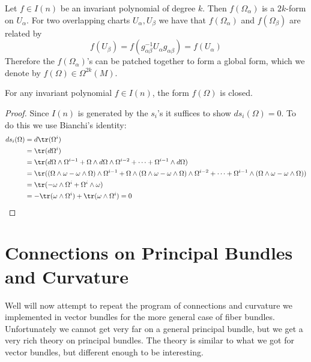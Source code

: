 


Let $f \in I(n)$ be an invariant polynomial of degree $k$. Then $f(\Omega_\alpha)$ is a $2k$-form on $U_\alpha$. For two overlapping charts $U_\alpha,U_\beta$ we have that $f(\Omega_\alpha)$ and $f(\Omega_\beta)$ are related by
\[ f(U_\beta) = f(g_{\alpha\beta}^{-1} U_\alpha g_{\alpha\beta}) = f(U_\alpha) \]
Therefore the $f(\Omega_\alpha)$'s can be patched together to form a global form, which we denote by $f(\Omega) \in \Omega^{2k}(M)$.
\begin{prop}
For any invariant polynomial $f \in I(n)$, the form $f(\Omega)$ is closed.
\end{prop}
\begin{proof}
Since $I(n)$ is generated by the $s_i$'s it suffices to show $d s_i(\Omega)=0$. To do this we use Bianchi's identity:
\begin{align*}
	ds_i(\Omega) &= d \tr(\Omega^i) \\
	             &= \tr (d\Omega^i) \\
	             &= \tr( d\Omega \wedge \Omega^{i-1} + \Omega \wedge d\Omega \wedge \Omega^{i-2}+ \cdots + \Omega^{i-1} \wedge d\Omega ) \\
	             &= \tr( (\Omega \wedge \omega - \omega \wedge \Omega) \wedge \Omega^{i-1} + \Omega \wedge (\Omega \wedge \omega - \omega \wedge \Omega) \wedge \Omega^{i-2}+ \cdots + \Omega^{i-1} \wedge (\Omega \wedge \omega - \omega \wedge \Omega) ) \\
	             &= \tr(-\omega \wedge \Omega^i + \Omega^i \wedge \omega) \\
	             &= -\tr(\omega \wedge \Omega^i) + \tr(\omega \wedge \Omega^i) = 0
\end{align*}
\end{proof}







\section{Connections on Principal Bundles and Curvature}

Well will now attempt to repeat the program of connections and curvature we implemented in vector bundles for the more general case of fiber bundles. Unfortunately we cannot get very far on a general principal bundle, but we get a very rich theory on principal bundles. The theory is similar to what we got for vector bundles, but different enough to be interesting.


